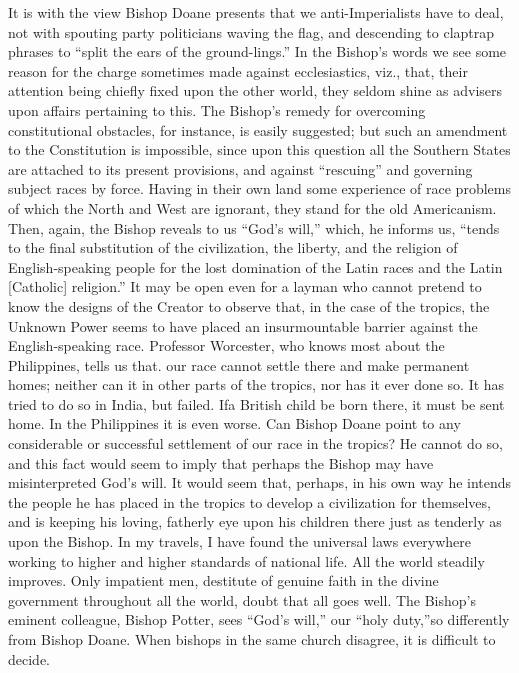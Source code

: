 \documentclass[11pt,openany]{book}
\begin{document}
It is with the view Bishop Doane presents that we anti-Imperialists have to deal, not with spouting party politicians waving the flag, and descending to claptrap phrases to ``split the ears of the ground-lings.'' In the Bishop's words we see some reason for the charge sometimes made against ecclesiastics, viz., that, their attention being chiefly fixed upon the other world, they seldom shine as advisers upon affairs pertaining to this. The Bishop's remedy for overcoming constitutional obstacles, for instance, is easily suggested; but such an amendment to the Constitution is impossible, since upon this question all the Southern States are attached to its present provisions, and against ``rescuing'' and governing subject races by force. Having in their own land some experience of race problems of which the North and West are ignorant, they stand for the old Americanism. Then, again, the Bishop reveals to us ``God's will,'' which, he informs us, ``tends to the final substitution of the civilization, the liberty, and the religion of English-speaking people for the lost domination of the Latin races and the Latin [Catholic] religion.'' It may be open even for a layman who cannot pretend to know the designs of the Creator to observe that, in the case of the tropics, the Unknown Power seems to have placed an insurmountable barrier against the English-speaking race. Professor Worcester, who knows most about the Philippines, tells us that. our race cannot settle there and make permanent homes; neither can it in other parts of the tropics, nor has it ever done so. It has tried to do so in India, but failed. Ifa British child be born there, it must be sent home. In the Philippines it is even worse. Can Bishop Doane point to any considerable or successful settlement of our race in the tropics? He cannot do so, and this fact would seem to imply that perhaps the Bishop may have misinterpreted God's will. It would seem that, perhaps, in his own way he intends the people he has placed in the tropics to develop a civilization for themselves, and is keeping his loving, fatherly eye upon his children there just as tenderly as upon the Bishop. In my travels, I have found the universal laws everywhere working to higher and higher standards of national life. All the world steadily improves. Only impatient men, destitute of genuine faith in the divine government throughout all the world, doubt that all goes well. The Bishop's eminent colleague, Bishop Potter, sees ``God's will,'' our ``holy duty,''so differently from Bishop Doane. When bishops in the same church disagree, it is difficult to decide.
\end{document}
